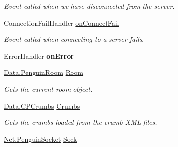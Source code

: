 \begin{DoxyCompactItemize}
\begin{DoxyCompactList}\small\item\em Event called when we have disconnected from the server. \end{DoxyCompactList}\item 
\hypertarget{classSharpenguin_1_1PenguinBase_a1c5c62147e5a63bc6ba03c85befa6f14}{Connection\-Fail\-Handler \hyperlink{classSharpenguin_1_1PenguinBase_a1c5c62147e5a63bc6ba03c85befa6f14}{on\-Connect\-Fail}}\label{classSharpenguin_1_1PenguinBase_a1c5c62147e5a63bc6ba03c85befa6f14}

\begin{DoxyCompactList}\small\item\em Event called when connecting to a server fails. \end{DoxyCompactList}\item 
\hypertarget{classSharpenguin_1_1PenguinBase_a209b85204c8df77c0ea7a50ee298ccd2}{Error\-Handler {\bfseries on\-Error}}\label{classSharpenguin_1_1PenguinBase_a209b85204c8df77c0ea7a50ee298ccd2}

\item 
\hypertarget{classSharpenguin_1_1PenguinBase_ab80d6631d32136aee2afcbfae17cdadf}{\hyperlink{classSharpenguin_1_1Data_1_1PenguinRoom}{Data.\-Penguin\-Room} \hyperlink{classSharpenguin_1_1PenguinBase_ab80d6631d32136aee2afcbfae17cdadf}{Room}}\label{classSharpenguin_1_1PenguinBase_ab80d6631d32136aee2afcbfae17cdadf}

\begin{DoxyCompactList}\small\item\em Gets the current room object. \end{DoxyCompactList}\item 
\hypertarget{classSharpenguin_1_1PenguinBase_ae6c9494b9dedabe094bb27aa586fe020}{\hyperlink{classSharpenguin_1_1Data_1_1CPCrumbs}{Data.\-C\-P\-Crumbs} \hyperlink{classSharpenguin_1_1PenguinBase_ae6c9494b9dedabe094bb27aa586fe020}{Crumbs}}\label{classSharpenguin_1_1PenguinBase_ae6c9494b9dedabe094bb27aa586fe020}

\begin{DoxyCompactList}\small\item\em Gets the crumbs loaded from the crumb X\-M\-L files. \end{DoxyCompactList}\item 
\hypertarget{classSharpenguin_1_1PenguinBase_afad693221b07f39b5e97120b0172b5b1}{\hyperlink{classSharpenguin_1_1Net_1_1PenguinSocket}{Net.\-Penguin\-Socket} \hyperlink{classSharpenguin_1_1PenguinBase_afad693221b07f39b5e97120b0172b5b1}{Sock}}\label{classSharpenguin_1_1PenguinBase_afad693221b07f39b5e97120b0172b5b1}


\end{DoxyCompactItemize}
